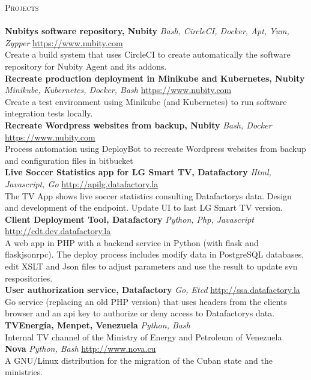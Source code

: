 \documentclass[a4paper]{article}
\newcommand{\lineunder} {
    \vspace*{-8pt} \\
    \hspace*{-18pt} \hrulefill \\
}
\newcommand{\header} [1] {
    {\hspace*{-18pt}\vspace*{6pt} \textsc{#1}}
    \vspace*{-6pt} \lineunder
}
\begin{document}
\header{Projects}
{\textbf{Nubity\textquotesingle{}s software repository, Nubity}} {\sl Bash, CircleCI, Docker, Apt, Yum, Zypper} \hfill \href{https://www.nubity.com}{https://www.nubity.com}\\
Create a build system that uses CircleCI to create automatically the software repository for Nubity Agent and its addons.\\
\vspace*{2mm}
{\textbf{Recreate production deployment in Minikube and Kubernetes, Nubity}} {\sl Minikube, Kubernetes, Docker, Bash} \hfill \href{https://www.nubity.com}{https://www.nubity.com}\\
Create a test environment using Minikube (and Kubernetes) to run software integration tests locally.\\
\vspace*{2mm}
{\textbf{Recreate Wordpress websites from backup, Nubity}} {\sl Bash, Docker} \hfill \href{https://www.nubity.com}{https://www.nubity.com}\\
Process automation using DeployBot to recreate Wordpress websites from backup and configuration files in bitbucket\\
\vspace*{2mm}
{\textbf{Live Soccer Statistics app for LG Smart TV, Datafactory}} {\sl Html, Javascript, Go} \hfill \href{http://apilg.datafactory.la}{http://apilg.datafactory.la}\\
The TV App shows live soccer statistics consulting Datafactory\textquotesingle{}s data. Design and development of the endpoint. Update UI to last LG Smart TV version.\\
\vspace*{2mm}
{\textbf{Client Deployment Tool, Datafactory}} {\sl Python, Php, Javascript} \hfill \href{http://cdt.dev.datafactory.la}{http://cdt.dev.datafactory.la}\\
A web app in PHP with a backend service in Python (with flask and flask\textunderscore jsonrpc). The deploy process includes modify data in PostgreSQL databases, edit XSLT and Json files to adjust parameters and use the result to update svn respositories.\\
\vspace*{2mm}
{\textbf{User authorization service, Datafactory}} {\sl Go, Etcd} \hfill \href{http://ssa.datafactory.la}{http://ssa.datafactory.la}\\
Go service (replacing an old PHP version) that uses headers from the client\textquotesingle{}s browser and an api key to authorize or deny access to Datafactory\textquotesingle{}s data.\\
\vspace*{2mm}
{\textbf{TVEnergía, Menpet, Venezuela}} {\sl Python, Bash} \\
Internal TV channel of the Ministry of Energy and Petroleum of Venezuela\\
\vspace*{2mm}
{\textbf{Nova}} {\sl Python, Bash} \hfill \href{http://www.nova.cu}{http://www.nova.cu}\\
A GNU/Linux distribution for the migration of the Cuban state and the ministries.\\
\vspace*{2mm}

\
\end{document}
